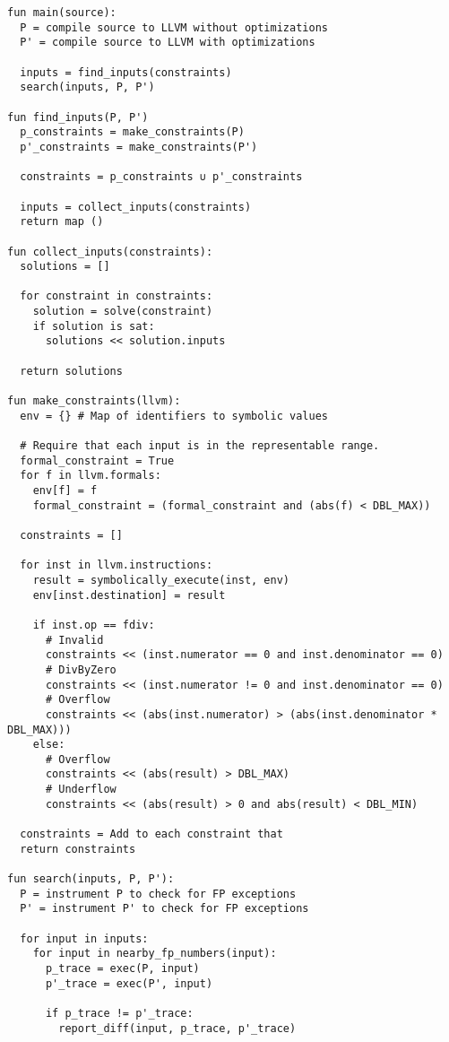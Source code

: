 \begin{lstlisting}
fun main(source):
  P = compile source to LLVM without optimizations
  P' = compile source to LLVM with optimizations

  inputs = find_inputs(constraints)
  search(inputs, P, P')

fun find_inputs(P, P')
  p_constraints = make_constraints(P)
  p'_constraints = make_constraints(P')

  constraints = p_constraints ∪ p'_constraints

  inputs = collect_inputs(constraints)
  return map ()

fun collect_inputs(constraints):
  solutions = []

  for constraint in constraints:
    solution = solve(constraint)
    if solution is sat:
      solutions << solution.inputs

  return solutions

fun make_constraints(llvm):
  env = {} # Map of identifiers to symbolic values

  # Require that each input is in the representable range.
  formal_constraint = True
  for f in llvm.formals:
    env[f] = f
    formal_constraint = (formal_constraint and (abs(f) < DBL_MAX))

  constraints = []

  for inst in llvm.instructions:
    result = symbolically_execute(inst, env)
    env[inst.destination] = result

    if inst.op == fdiv:
      # Invalid
      constraints << (inst.numerator == 0 and inst.denominator == 0)
      # DivByZero
      constraints << (inst.numerator != 0 and inst.denominator == 0)
      # Overflow
      constraints << (abs(inst.numerator) > (abs(inst.denominator * DBL_MAX)))
    else:
      # Overflow
      constraints << (abs(result) > DBL_MAX)
      # Underflow
      constraints << (abs(result) > 0 and abs(result) < DBL_MIN)

  constraints = Add to each constraint that 
  return constraints

fun search(inputs, P, P'):
  P = instrument P to check for FP exceptions
  P' = instrument P' to check for FP exceptions

  for input in inputs:
    for input in nearby_fp_numbers(input):
      p_trace = exec(P, input)
      p'_trace = exec(P', input)

      if p_trace != p'_trace:
        report_diff(input, p_trace, p'_trace)
\end{lstlisting}

\printbibheading
\printbibliography
